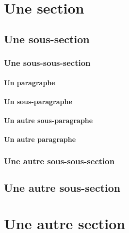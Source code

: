\lipsum[26-27]

\section{Une section}

\lipsum[28-29]

\subsection{Une sous-section}

\lipsum[29-31]

\subsubsection{Une sous-sous-section}

\lipsum[31-35]

\paragraph{Un paragraphe}

\lipsum[36-38]

\paragraph{Un sous-paragraphe}

\lipsum[39-41]

\paragraph{Un autre sous-paragraphe}

\lipsum[39-41]

\paragraph{Un autre paragraphe}

\lipsum[36-38]

\subsubsection{Une autre sous-sous-section}

\lipsum[31-35]

\subsection{Une autre sous-section}

\lipsum[29-31]

\section{Une autre section}

\lipsum[28-55]

